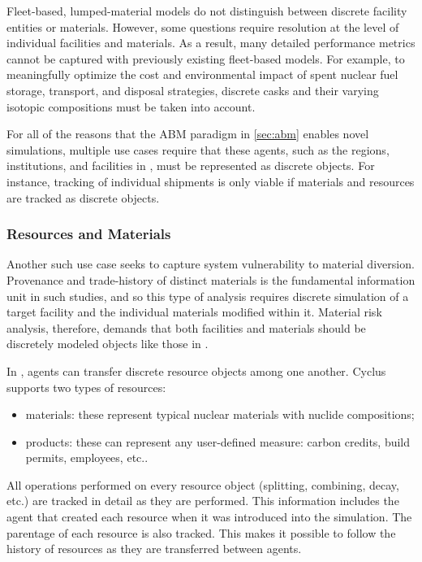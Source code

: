 Fleet-based, lumped-material models do not distinguish between discrete facility
entities or materials. However, some questions require resolution at the level
of individual facilities and materials. As a result, many detailed performance
metrics cannot be captured with previously existing fleet-based models. For 
example, to meaningfully optimize the cost and environmental impact of spent 
nuclear fuel storage, transport, and disposal strategies, discrete casks and 
their varying isotopic compositions must be taken into account.

For all
of the reasons that the \gls{ABM} paradigm in \ref{sec:abm} enables novel
simulations, multiple use cases require that these agents, such as the regions,
institutions, and facilities in \Cyclus, must be represented as discrete
objects. For instance, tracking of individual shipments is only viable if materials and
resources are tracked as discrete objects.

\subsubsection{Resources and Materials}
\label{sec:mats}

Another such use case seeks to capture system vulnerability to
material diversion. Provenance and trade-history of distinct materials is the fundamental
information unit in such studies, and so this type of analysis requires
 discrete simulation of a
target facility and the individual materials modified within it.
Material risk analysis, therefore, demands that both facilities and materials
should be discretely modeled objects like those in \Cyclus.

In \Cyclus, agents can transfer discrete resource objects among one another.
Cyclus supports two types of resources:

\begin{itemize}

  \item materials: these represent typical nuclear materials with
      nuclide compositions;

  \item products: these can represent any user-defined measure: carbon
      credits, build permits, employees, etc..

\end{itemize}

All operations performed on every resource object (splitting, combining,
decay, etc.) are tracked in detail as they are performed.  This information
includes the agent that created each resource when it was introduced into the
simulation.  The parentage of each resource is also tracked. This makes it
possible to follow the history of resources as they are transferred between
agents.

